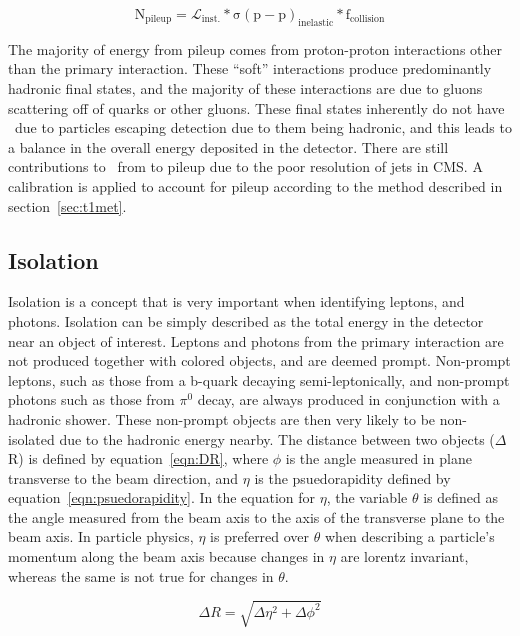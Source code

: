 \begin{equation}
\label{eqn:pileup}
  \mathrm{N_{pileup} = \mathcal{L}_{inst.}*\sigma(p-p)_{inelastic}*f_{collision}}
\end{equation}

The majority of energy from pileup comes from proton-proton interactions other than the primary interaction.
These ``soft'' interactions produce predominantly hadronic final states,
and the majority of these interactions are due to gluons scattering off of quarks or other gluons.
These final states inherently do not have \MET\ due to particles escaping detection due to them being hadronic,
and this leads to a balance in the overall energy deposited in the detector.
There are still contributions to \MET\ from to pileup due to the poor resolution of jets in CMS.
A calibration is applied to account for pileup according to the method described in section~\ref{sec:t1met}.


\subsection{Isolation}
\label{ssec:isolation_summary}
Isolation is a concept that is very important when identifying leptons, and photons.
Isolation can be simply described as the total energy in the detector near an object of interest.
Leptons and photons from the primary interaction are not produced together with colored objects,
and are deemed prompt.
Non-prompt leptons, such as those from a b-quark decaying semi-leptonically,
and non-prompt photons such as those from $\pi ^{0}$ decay,
are always produced in conjunction with a hadronic shower.
These non-prompt objects are then very likely to be non-isolated due to the hadronic energy nearby.
The distance between two objects ($\Delta$R) is defined by equation~\ref{eqn:DR},
where $\phi$ is the angle measured in plane transverse to the beam direction,
and $\eta$ is the psuedorapidity defined by equation~\ref{eqn:psuedorapidity}.
In the equation for $\eta$, the variable $\theta$ is defined as the angle measured from the beam axis to the axis of the transverse plane to the beam axis.
In particle physics, $\eta$ is preferred over $\theta$ when describing a particle's momentum along the beam axis because changes in $\eta$ are lorentz invariant,
whereas the same is not true for changes in $\theta$.

\begin{equation}
  \label{eqn:DR}
  \Delta R = \sqrt{\Delta\eta^{2}+\Delta\phi^{2}}
\end{equation}

